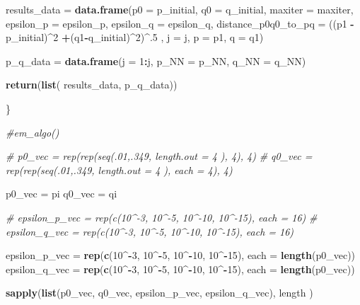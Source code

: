 \documentclass[]{article}
\newenvironment{Shaded}{\begin{snugshade}}{\end{snugshade}}
\newcommand{\KeywordTok}[1]{\textcolor[rgb]{0.13,0.29,0.53}{\textbf{#1}}}
\newcommand{\DataTypeTok}[1]{\textcolor[rgb]{0.13,0.29,0.53}{#1}}
\newcommand{\DecValTok}[1]{\textcolor[rgb]{0.00,0.00,0.81}{#1}}
\newcommand{\StringTok}[1]{\textcolor[rgb]{0.31,0.60,0.02}{#1}}
\newcommand{\CommentTok}[1]{\textcolor[rgb]{0.56,0.35,0.01}{\textit{#1}}}
\newcommand{\OperatorTok}[1]{\textcolor[rgb]{0.81,0.36,0.00}{\textbf{#1}}}
\newcommand{\NormalTok}[1]{#1}
\begin{document}
\begin{Shaded}
\begin{Highlighting}[]
\NormalTok{      results_data =}\StringTok{ }\KeywordTok{data.frame}\NormalTok{(}\DataTypeTok{p0 =}\NormalTok{ p_initial, }\DataTypeTok{q0 =}\NormalTok{ q_initial, }\DataTypeTok{maxiter =}\NormalTok{ maxiter, }\DataTypeTok{epsilon_p =}\NormalTok{ epsilon_p, }\DataTypeTok{epsilon_q =}\NormalTok{ epsilon_q, }\DataTypeTok{distance_p0q0_to_pq =}\NormalTok{ ((p1 }\OperatorTok{-}\StringTok{ }\NormalTok{p_initial)}\OperatorTok{^}\DecValTok{2} \OperatorTok{+}\NormalTok{(q1}\OperatorTok{-}\NormalTok{q_initial)}\OperatorTok{^}\DecValTok{2}\NormalTok{)}\OperatorTok{^}\NormalTok{.}\DecValTok{5}\NormalTok{ , }\DataTypeTok{j =}\NormalTok{ j, }\DataTypeTok{p =}\NormalTok{ p1, }\DataTypeTok{q =}\NormalTok{ q1)}
  
\NormalTok{      p_q_data =}\StringTok{ }\KeywordTok{data.frame}\NormalTok{(}\DataTypeTok{j =} \DecValTok{1}\OperatorTok{:}\NormalTok{j, }\DataTypeTok{p_NN =}\NormalTok{ p_NN, }\DataTypeTok{q_NN =}\NormalTok{ q_NN)}
  
      \KeywordTok{return}\NormalTok{(}\KeywordTok{list}\NormalTok{( results_data, p_q_data))}

\NormalTok{\}}

\CommentTok{#em_algo()}
\end{Highlighting}
\end{Shaded}

\begin{Shaded}
\begin{Highlighting}[]
\CommentTok{# p0_vec = rep(rep(seq(.01,.349, length.out = 4 ), 4), 4)}
\CommentTok{# q0_vec = rep(rep(seq(.01,.349, length.out = 4 ), each = 4), 4)}

\NormalTok{p0_vec =}\StringTok{ }\NormalTok{pi}
\NormalTok{q0_vec =}\StringTok{ }\NormalTok{qi}

\CommentTok{# epsilon_p_vec = rep(c(10^-3, 10^-5, 10^-10, 10^-15), each = 16)}
\CommentTok{# epsilon_q_vec = rep(c(10^-3, 10^-5, 10^-10, 10^-15), each = 16)}


\NormalTok{epsilon_p_vec =}\StringTok{ }\KeywordTok{rep}\NormalTok{(}\KeywordTok{c}\NormalTok{(}\DecValTok{10}\OperatorTok{^-}\DecValTok{3}\NormalTok{, }\DecValTok{10}\OperatorTok{^-}\DecValTok{5}\NormalTok{, }\DecValTok{10}\OperatorTok{^-}\DecValTok{10}\NormalTok{, }\DecValTok{10}\OperatorTok{^-}\DecValTok{15}\NormalTok{), }\DataTypeTok{each =} \KeywordTok{length}\NormalTok{(p0_vec))}
\NormalTok{epsilon_q_vec =}\StringTok{ }\KeywordTok{rep}\NormalTok{(}\KeywordTok{c}\NormalTok{(}\DecValTok{10}\OperatorTok{^-}\DecValTok{3}\NormalTok{, }\DecValTok{10}\OperatorTok{^-}\DecValTok{5}\NormalTok{, }\DecValTok{10}\OperatorTok{^-}\DecValTok{10}\NormalTok{, }\DecValTok{10}\OperatorTok{^-}\DecValTok{15}\NormalTok{), }\DataTypeTok{each =} \KeywordTok{length}\NormalTok{(p0_vec))}

\KeywordTok{sapply}\NormalTok{(}\KeywordTok{list}\NormalTok{(p0_vec, q0_vec, epsilon_p_vec, epsilon_q_vec), length )}
\end{Highlighting}
\end{Shaded}
\end{document}
